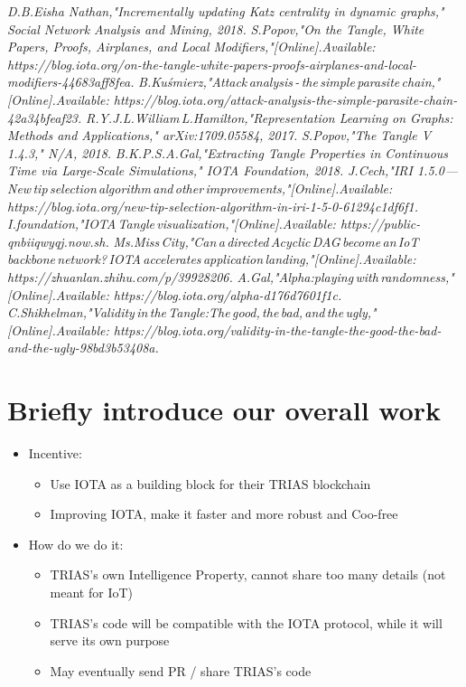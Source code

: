 \documentclass{article}
\begin{document}
\begin{thebibliography}{ }
	\textit{D.B.Eisha Nathan,"Incrementally updating Katz centrality in dynamic graphs," Social Network Analysis and Mining, 2018. }
	\textit{S.Popov,"On the Tangle, White Papers, Proofs, Airplanes, and Local Modifiers,"[Online].Available: https://blog.iota.org/on-the-tangle-white-papers-proofs-airplanes-and-local-modifiers-44683aff8fea.}
	\textit{B.Kuśmierz,"Attack\,analysis\,-\,the\,simple\,parasite\,chain,"[Online].Available: https://blog.iota.org/attack-analysis-the-simple-parasite-chain-42a34bfeaf23.}
	\textit{R.Y.J.L.William\,L.Hamilton,"Representation Learning on Graphs: Methods and Applications," arXiv:1709.05584, 2017.}
	\textit{S.Popov,"The Tangle V 1.4.3," N/A, 2018.}
	\textit{B.K.P.S.A.Gal,"Extracting Tangle Properties in Continuous Time via Large-Scale Simulations," IOTA Foundation, 2018.}
	\textit{J.Cech,"IRI 1.5.0 — New\,tip\,selection\,algorithm\,and\,other\,improvements,"[Online].Available: https://blog.iota.org/new-tip-selection-algorithm-in-iri-1-5-0-61294c1df6f1.}
	\textit{I.foundation,"IOTA\,Tangle\,visualization,"[Online].Available: https://public-qnbiiqwyqj.now.sh.}
	\textit{Ms.Miss\,City,"Can\,a\,directed\,Acyclic\,DAG\,become\,an\,IoT\,backbone\,network?\,IOTA\,accelerates\,application\,landing,"[Online].Available: https://zhuanlan.zhihu.com/p/39928206.}
	\textit{A.Gal,"Alpha:playing\,with\,randomness,"[Online].Available: https://blog.iota.org/alpha-d176d7601f1c.}
	\textit{C.Shikhelman,"Validity\,in\,the\,Tangle:The\,good,\,the\,bad,\,and\,the\,ugly,"[Online].Available: https://blog.iota.org/validity-in-the-tangle-the-good-the-bad-and-the-ugly-98bd3b53408a.}
\end{thebibliography}

\section{Briefly introduce our overall work}
\begin{itemize}
	\item Incentive:
		\begin{itemize}
			\item Use IOTA as a building block for their TRIAS blockchain
			\item Improving IOTA, make it faster and more robust and Coo-free
		\end{itemize}
	\item How do we do it: 
	\begin{itemize}
		\item TRIAS's own Intelligence Property, cannot share too many details (not meant for IoT)
		\item TRIAS’s code will be compatible with the IOTA protocol, while it will serve its own purpose
		\item May eventually send PR / share TRIAS’s code
	\end{itemize}
\end{itemize}
\end{document}
